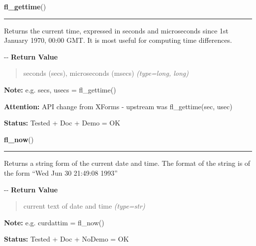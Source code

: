 \hspace{.8\funcindent}\begin{boxedminipage}{\funcwidth}

    \raggedright \textbf{fl\_gettime}()

    \vspace{-1.5ex}

    \rule{\textwidth}{0.5\fboxrule}
\setlength{\parskip}{2ex}

Returns the current time, expressed in seconds and microseconds since
1st January 1970, 00:00 GMT. It is most useful for computing time
differences.

-{}-
\setlength{\parskip}{1ex}
      \textbf{Return Value}
    \vspace{-1ex}

      \begin{quote}

seconds (secs), microseconds (msecs)
      {\it (type=long, long)}

      \end{quote}

\textbf{Note:} 
e.g. secs, usecs = fl\_gettime()


\textbf{Attention:} 
API change from XForms - upstream was fl\_gettime(sec, usec)


\textbf{Status:} 
Tested + Doc + Demo = OK


    \end{boxedminipage}

    \label{xformslib:flbasic:fl_now}

    \vspace{0.5ex}

\hspace{.8\funcindent}\begin{boxedminipage}{\funcwidth}

    \raggedright \textbf{fl\_now}()

    \vspace{-1.5ex}

    \rule{\textwidth}{0.5\fboxrule}
\setlength{\parskip}{2ex}

Returns a string form of the current date and time. The format of the
string is of the form ``Wed Jun 30 21:49:08 1993''

-{}-
\setlength{\parskip}{1ex}
      \textbf{Return Value}
    \vspace{-1ex}

      \begin{quote}

current text of date and time
      {\it (type=str)}

      \end{quote}

\textbf{Note:} 
e.g. curdattim = fl\_now()


\textbf{Status:} 
Tested + Doc + NoDemo = OK


    \end{boxedminipage}

